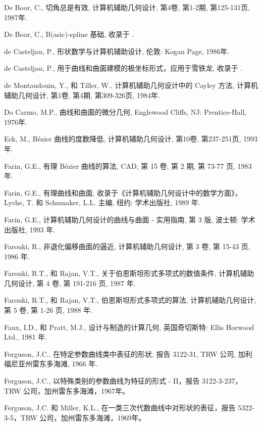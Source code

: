 \documentclass[../main.tex]{subfiles}
\begin{document}
\begin{BookBibliography}
 De Boor, C., 切角总是有效, 计算机辅助几何设计, 第4卷, 第1-2期, 第125-131页, 1987年.

 De Boor, C., B(asic)-spline 基础, 收录于 \cite{Pieg93}.

 de Casteljau, P., 形状数学与计算机辅助设计, 伦敦: Kogan Page, 1986年.

 de Casteljau, P., 用于曲线和曲面建模的极坐标形式，应用于雪铁龙, 收录于 \cite{Pieg93}.

 de Montaudouin, Y., 和 Tiller, W., 计算机辅助几何设计中的 Cayley 方法, 计算机辅助几何设计, 第1卷, 第4期, 第309-326页, 1984年.

 Do Carmo, M.P., 曲线和曲面的微分几何, Englewood Cliffs, NJ: Prentice-Hall, 1976年.

 Eck, M., Bézier 曲线的度数降低, 计算机辅助几何设计, 第10卷, 第237-251页, 1993年.

 Farin, G.E., 有理 Bézier 曲线的算法, CAD, 第 15 卷, 第 2 期, 第 73-77 页, 1983 年.

 Farin, G.E., 有理曲线和曲面, 收录于《计算机辅助几何设计中的数学方面》，Lyche, T. 和 Schumaker, L.L. 主编, 纽约: 学术出版社, 1989 年.

 Farin, G.E., 计算机辅助几何设计的曲线与曲面 - 实用指南, 第 3 版, 波士顿: 学术出版社, 1993 年.

 Farouki, R., 非退化偏移曲面的逼近, 计算机辅助几何设计, 第 3 卷, 第 15-43 页, 1986 年.

 Farouki, R.T., 和 Rajan, V.T., 关于伯恩斯坦形式多项式的数值条件, 计算机辅助几何设计, 第 4 卷, 第 191-216 页, 1987 年.

 Farouki, R.T., 和 Rajan, V.T., 伯恩斯坦形式多项式的算法, 计算机辅助几何设计, 第 5 卷, 第 1-26 页, 1988 年.

 Faux, I.D., 和 Pratt, M.J., 设计与制造的计算几何, 英国奇切斯特: Ellis Horwood Ltd., 1981 年.

 Ferguson, J.C., 在特定参数曲线类中表征的形状, 报告 3122-31, TRW 公司, 加利福尼亚州雷东多海滩, 1966 年.

 Ferguson, J.C., 以特殊类别的参数曲线为特征的形式 - II，报告 3122-3-237，TRW 公司，加州雷东多海滩，1967年。

 Ferguson, J.C. 和 Miller, K.L., 在一类三次代数曲线中对形状的表征，报告 5322-3-5，TRW 公司，加州雷东多海滩，1969年。


\end{BookBibliography}
\end{document}
